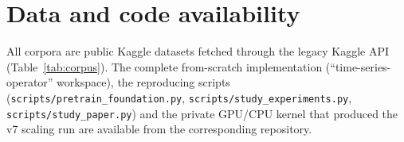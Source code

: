 \documentclass[11pt]{article}
\begin{document}
\section*{Data and code availability}
All corpora are public Kaggle datasets fetched through the legacy Kaggle API
(Table~\ref{tab:corpus}). The complete from-scratch implementation
(``time-series-operator'' workspace), the reproducing scripts
(\texttt{scripts/pretrain\_foundation.py}, \texttt{scripts/study\_experiments.py},
\texttt{scripts/study\_paper.py}) and the private GPU/CPU kernel that
produced the v7 scaling run are available from the corresponding repository.
\end{document}
